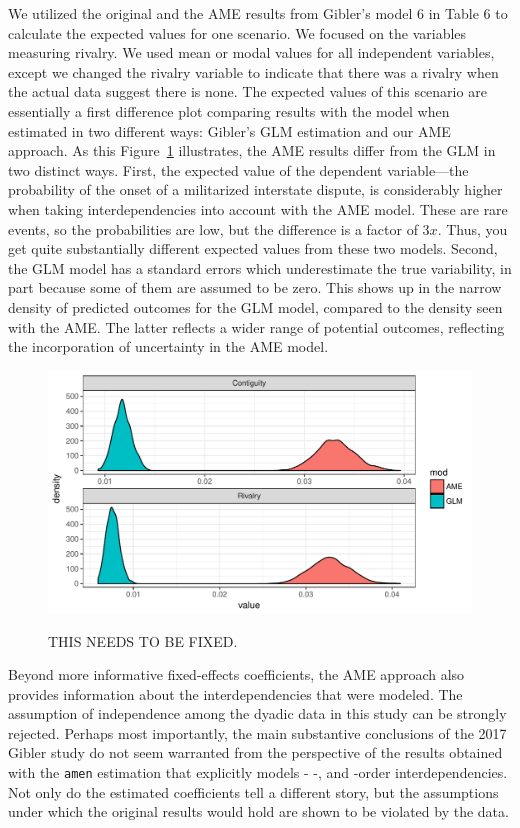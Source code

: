 We utilized the original and the AME results from Gibler's model 6 in Table 6 to calculate the expected values for one scenario. We focused on the variables measuring rivalry.  We used mean or modal values for all independent variables, except we changed the rivalry variable to indicate that there was a rivalry when the actual data suggest there is none.  The expected values of this scenario are essentially a first difference plot comparing results with the model when estimated in two different ways: Gibler's GLM estimation and our AME approach.  As this Figure~\ref{fig:gibmargeff} illustrates, the AME results differ from the GLM in two distinct ways. First, the expected value of the dependent variable---the probability of the onset of a militarized interstate dispute, is considerably higher when taking interdependencies into account with the AME model.  These are rare events, so the probabilities are low, but the difference is a factor of $3x$. Thus, you get quite substantially different expected values from these two models.  Second, the GLM model has a standard errors which underestimate the true variability, in part because some of them are assumed to be zero.  This shows up in the narrow density of predicted outcomes for the GLM model, compared to the density seen with the AME. The latter reflects a wider range of potential outcomes, reflecting the incorporation of uncertainty in the AME model.

\begin{figure}
	\caption{THIS NEEDS TO BE FIXED.  \label{fig:gibmargeff}}
	\includegraphics[width=\textwidth]{gibler_margeff.pdf}
 	\label{fig:gibmargeff}
 \end{figure}

Beyond more informative fixed-effects coefficients, the AME approach also provides information about the interdependencies that were modeled. The assumption of independence among the dyadic data in this study can be strongly rejected. Perhaps most importantly, the main substantive conclusions of the 2017 Gibler study do not seem warranted from the perspective of the results obtained with the \texttt{amen} estimation that explicitly models \first- \second-, and \third-order interdependencies. Not only do the estimated coefficients tell a different story, but the assumptions under which the original results would hold are shown to be violated by the data.

